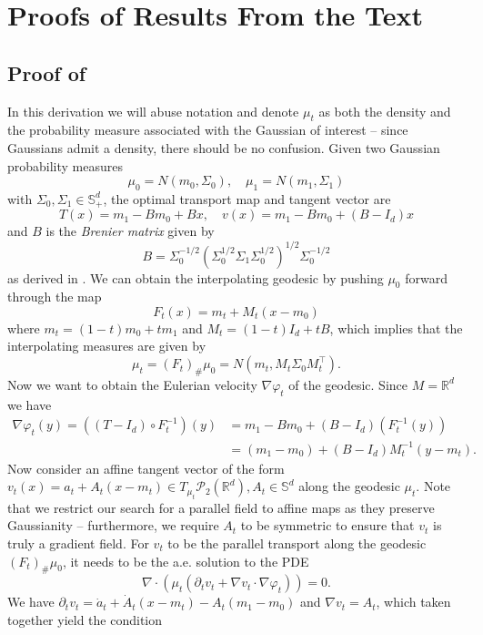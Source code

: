\documentclass[11pt]{article}
\newcommand{\man}{M}
\begin{document}
\section{Proofs of Results From the Text} \label{sec: proof of main results}

\subsection{Proof of } \label{sec: proof of Gaussian parallel transport}
In this derivation we will abuse notation and denote $\mu_t$ as both the density and the probability measure associated with the Gaussian of interest -- since Gaussians admit a density, there should be no confusion. Given two Gaussian probability measures 
\[\mu_0 = N(m_0, \Sigma_0),  \quad \mu_1 = N(m_1, \Sigma_1)\]
with $\Sigma_0, \Sigma_1 \in \mathbb{S}_+^d$, the optimal transport map and tangent vector are
\[T(x) = m_1 - Bm_0 + Bx, \quad v(x) = m_1 - Bm_0 + (B - I_d)x\]
and $B$ is the \textit{Brenier matrix} given by 
\[B = \Sigma_0^{-1/2}\left(\Sigma_0^{1/2}\Sigma_1\Sigma_0^{1/2}\right)^{1/2}\Sigma_0^{-1/2}\]
as derived in \citet{ojm/1326291215}. We can obtain the interpolating geodesic by pushing $\mu_0$ forward through the map 
\[F_t(x) = m_t + M_t(x - m_0)\]
where $m_t = (1-t)m_0 + tm_1$ and $M_t = (1-t)I_d + tB$,  which implies that the interpolating measures are given by
\[\mu_t = (F_t)_\#\mu_0 = N(m_t, M_t\Sigma_0M_t^{\top}).\]
Now we want to obtain the Eulerian velocity $\nabla\varphi_t$ of the geodesic. Since $\man = \mathbb{R}^d$ we have 
\begin{align*}
    \nabla\varphi_t(y) = ((T - I_d) \circ F^{-1}_t)(y) &= m_1 - Bm_0 + (B - I_d)(F_t^{-1}(y)) \\
    &= (m_1 - m_0) + \left(B - I_d\right)M_t^{-1}\left(y - m_t\right).
\end{align*}
Now consider an affine tangent vector of the form $v_t(x) = a_t + A_t(x-m_t) \in T_{\mu_t}\mathcal{P}_2(\mathbb{R}^d), A_t \in \mathbb{S}^d$ along the geodesic $\mu_t$. Note that we restrict our search for a parallel field to affine maps as they preserve Gaussianity -- furthermore, we require $A_t$ to be symmetric to ensure that $v_t$ is truly a gradient field. For $v_t$ to be the parallel transport along the geodesic $(F_t)_\#\mu_0$, it needs to be the a.e. solution to the PDE
\[\nabla\cdot \left(\mu_t \left(\partial_tv_t + \nabla v_t \cdot \nabla\varphi_t \right)\right) = 0.\]
We have $\partial_tv_t = \dot a_t + \dot A_t (x - m_t) - A_t(m_1 - m_0)$ and $\nabla v_t = A_t$, which taken together yield the condition
\end{document}
